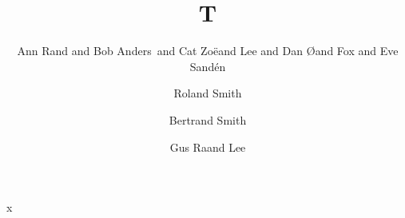 \documentclass{article}
\begin{document}
\title{T}
\author{Ann Rand and Bob Anders\ and Cat Zo\"{e}and Lee and Dan {\O}and Fox and Eve Sand\'{e}n
  \and Rol\-and Smith \and Bertr\/and Smith \and Gus Ra\dj and Lee}
\maketitle
x
\end{document}
